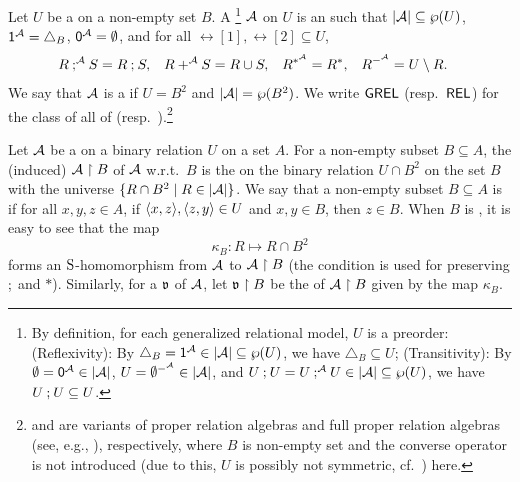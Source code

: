 Let $U$ be a  on a non-empty set $B$.
A \intro*{}\footnote{
By definition, for each generalized relational model, $U$ is a preorder:
(Reflexivity): By $\triangle_{B} = \id^{\alg} \in \domain{\alg} \subseteq \wp(U)$, we have $\triangle_{B} \subseteq U$;
(Transitivity): By $\emptyset = \emp^{\alg} \in \domain{\alg}$, $U = \emptyset^{-^{\alg}} \in \domain{\alg}$,
and $U \rcompo U = U \compo^{\alg} U \in \domain{\alg} \subseteq \wp(U)$, we have $U \mathbin{;} U \subseteq U$.} $\alg$ on $U$ is an  such that $\domain{\alg} \subseteq \wp(U)$,
$\id^{\alg} = \triangle_{B}$,
$\emp^{\alg} = \emptyset$, and
for all $\rel[1], \rel[2] \subseteq U$,
\begin{align*}
    \rel[1] \compo^{\alg} \rel[2] & = \rel[1] \rcompo \rel[2], &
    \rel[1] \union^{\alg} \rel[2]   & = \rel[1] \cup \rel[2],   &
    \rel[1]^{\kstar^{\alg}}       & = \rel[1]^{\kstar},       &
    \rel[1]^{\compl^{\alg}}       & = U \setminus \rel[1].
\end{align*}
We say that $\alg$ is a \intro*{} if $U = B^2$ and $\domain{\alg} = \wp(B^2)$.
We write $\mathsf{GREL}$ (resp.\ $\mathsf{REL}$) for the class of all  of  (resp.\ ).\footnote{ and  are variants of proper relation algebras and full proper relation algebras (see, e.g., \cite{robinhirschRelationAlgebrasGames2002}), respectively, where $B$ is non-empty set and the converse operator is not introduced (due to this, $U$ is possibly not symmetric, cf.\ \cite[Lem.\ 3.4]{robinhirschRelationAlgebrasGames2002}) here.}

Let $\alg$ be a  on a binary relation $U$ on a set $A$.
For a non-empty subset $B \subseteq A$,
the (induced) \intro*{} $\alg \restriction B$ of $\alg$ w.r.t.\ $B$ is the  on the binary relation $U \cap B^2$ on the set $B$ with the universe $\set{ R \cap B^2 \mid R \in \domain{\alg}}$.
We say that a non-empty subset $B \subseteq A$ is \intro*{} if
for all $x, y, z \in A$, if $\langle x, z\rangle, \langle z, y\rangle \in U$ and $x, y \in B$, then $z \in B$.
When $B$ is , it is easy to see that the map 
\[\kappa_{B} \colon R \mapsto R \cap B^2\]
forms an $\mathrm{S}$-homomorphism from $\alg$ to $\alg \restriction B$ (the condition is used for preserving $\mathbin{;}$ and $*$).
Similarly, for a  $\mathfrak{v}$ of $\alg$, let $\mathfrak{v} \restriction B$ be the  of $\alg \restriction B$ given by the map $\kappa_{B}$.

